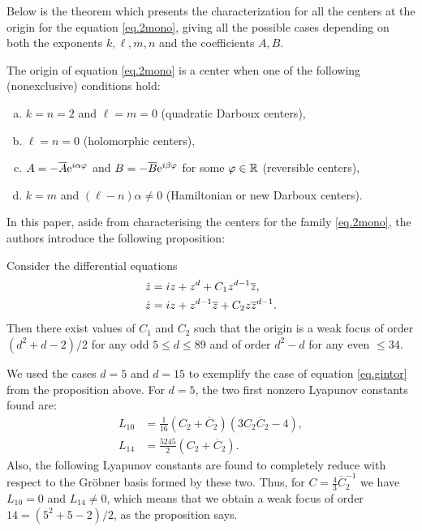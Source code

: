 Below is the theorem which presents the characterization for all the centers at the origin for the equation \eqref{eq.2mono}, giving all the possible cases depending on both the exponents $k,\ell,m,n$ and the coefficients $A,B$.

\begin{theorem}
\label{th.2mono}
The origin of equation \eqref{eq.2mono} is a center when one of the following (nonexclusive) conditions hold:
\begin{enumerate}[(a)]
\item
$k=n=2$ and $\ell=m=0$ (quadratic Darboux centers),
\item
$\ell=n=0$ (holomorphic centers),
\item
$A=-\overline A\mathrm{e}^{i \alpha \varphi}$ and $B=-\overline B\mathrm{e}^{i \beta \varphi}$ for some $\varphi\in\mathbb{R}$ (reversible centers),
\item
$k=m$ and 	$(\ell-n)\alpha\ne0$ (Hamiltonian or new Darboux centers).
\end{enumerate}
\end{theorem}

In this paper, aside from characterising the centers for the family \eqref{eq.2mono}, the authors introduce the following proposition:
\begin{proposition}
Consider the differential equations
\begin{align}
\dot z &= iz+z^d+C_1z^{d-1}\overline{z},\\
\dot z &= iz+z^{d-1}\overline{z}+C_2z\overline{z}^{d-1}.
\label{eq.gintor}
\end{align}
Then there exist values of $C_1$ and $C_2$ such that the origin is a weak focus of order $(d^2+d-2)/2$ for any odd $5\le d\le89$ and of order $d^2-d$ for any even $\le34$.
\end{proposition}

We used the cases $d=5$ and $d=15$ to exemplify the case of equation \eqref{eq.gintor} from the proposition above. For $d=5$, the two first nonzero Lyapunov constants found are:
\begin{align*}
L_{10}&=\frac{1}{16}(C_2+\overline{C}_2)(3C_2\overline{C}_2-4),\\
L_{14}&=\frac{5245}{2}(C_2+\overline{C}_2).
\end{align*}
Also, the following Lyapunov constants are found to completely reduce with respect to the Gröbner basis formed by these two. Thus, for $C=\frac{4}{3}\overline{C}_2^{-1}$ we have $L_{10}=0$ and $L_{14}\ne0$, which means that we obtain a weak focus of order $14=(5^2+5-2)/2$, as the proposition says.

